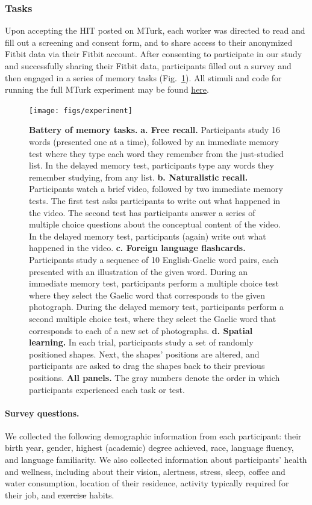 \documentclass[10pt]{article}
\providecommand{\DIFaddtex}[1]{{\protect\color{blue}\uwave{#1}}} %
\providecommand{\DIFdeltex}[1]{{\protect\color{red}\sout{#1}}}                      %
\providecommand{\DIFaddbegin}{} %
\providecommand{\DIFaddend}{} %
\providecommand{\DIFdelbegin}{} %
\providecommand{\DIFdelend}{} %
\providecommand{\DIFadd}[1]{\texorpdfstring{\DIFaddtex{#1}}{#1}} %
\providecommand{\DIFdel}[1]{\texorpdfstring{\DIFdeltex{#1}}{}} %
\newcommand{\DIFscaledelfig}{0.5}
\newlength{\DIFdelgraphicswidth} %
\newlength{\DIFdelgraphicsheight} %
\newcommand{\DIFaddincludegraphics}[2][]{{\color{blue}\fbox{\DIFOincludegraphics[#1]{#2}}}} %
\newcommand{\DIFdelincludegraphics}[2][]{%
\sbox{\DIFdelgraphicsbox}{\DIFOincludegraphics[#1]{#2}}%
\settoboxwidth{\DIFdelgraphicswidth}{\DIFdelgraphicsbox} %
\settoboxtotalheight{\DIFdelgraphicsheight}{\DIFdelgraphicsbox} %
\scalebox{\DIFscaledelfig}{%
\parbox[b]{\DIFdelgraphicswidth}{\usebox{\DIFdelgraphicsbox}\\[-\baselineskip] \rule{\DIFdelgraphicswidth}{0em}}\llap{\resizebox{\DIFdelgraphicswidth}{\DIFdelgraphicsheight}{%
\setlength{\unitlength}{\DIFdelgraphicswidth}%
\begin{picture}(1,1)%
\thicklines\linethickness{2pt} %
{\color[rgb]{1,0,0}\put(0,0){\framebox(1,1){}}}%
{\color[rgb]{1,0,0}\put(0,0){\line( 1,1){1}}}%
{\color[rgb]{1,0,0}\put(0,1){\line(1,-1){1}}}%
\end{picture}%
}\hspace*{3pt}}} %
} %
\DeclareRobustCommand{\DIFaddbegin}{\DIFOaddbegin \let\includegraphics\DIFaddincludegraphics} %
\DeclareRobustCommand{\DIFaddend}{\DIFOaddend \let\includegraphics\DIFOincludegraphics} %
\DeclareRobustCommand{\DIFdelbegin}{\DIFOdelbegin \let\includegraphics\DIFdelincludegraphics} %
\DeclareRobustCommand{\DIFdelend}{\DIFOaddend \let\includegraphics\DIFOincludegraphics} %
\begin{document}
\subsubsection*{Tasks}
Upon accepting the HIT posted on MTurk, each worker was
directed to read and fill out a screening and consent form, and to
share access to their anonymized Fitbit data via their Fitbit account.
After consenting to participate in our study and successfully sharing their Fitbit
data, participants filled out a survey and then engaged in a series of
memory tasks (Fig.~\ref{fig:tasks}).  All stimuli and code for running
the full MTurk experiment may be found
\href{https://github.com/ContextLab/brainfit-task}{\underline{here}}.

\begin{figure}[tp]
\centering
\texttt{[image: figs/experiment]}
\caption{\textbf{Battery of memory tasks.}  \textbf{a.  Free recall.}
Participants study 16 words (presented one at a time), followed by an
immediate memory test where they type
each word they remember from the just-studied list.  In the delayed
memory test, participants type any words they remember studying, from
any list.  \textbf{b. Naturalistic recall.}  Participants watch a
brief video, followed by two immediate memory tests.  The first test
asks participants to write out what happened in the video.  The second
test has participants answer a series of multiple choice questions
about the conceptual content of the video.  In the delayed memory
test, participants (again) write out what happened in the video.
\textbf{c. Foreign language flashcards.}  Participants study a
sequence of 10 English-Gaelic word pairs, each presented with an
illustration of the given word.  During an immediate memory test,
participants perform a multiple choice test where they select the
Gaelic word that corresponds to the given photograph.  During the
delayed memory test, participants perform a second multiple choice
test, where they select the Gaelic word that corresponds to each of a
new set of photographs.  \textbf{d. Spatial learning.}  In each trial,
participants
study a set of randomly positioned shapes.  Next, the shapes'
positions are altered, and participants are asked to drag the shapes
back to their previous positions.  \textbf{All panels.}  The gray
numbers denote the order in which participants experienced each task
or test.}
\label{fig:tasks}
\end{figure}

\paragraph*{Survey questions.}  We collected the following demographic
information from each participant: their birth year, gender, highest
(academic) degree achieved, race, language fluency, and language
familiarity.  We also collected information about participants'
health and wellness, including about their vision, alertness, stress, sleep, coffee
and water consumption, location of their residence, activity typically
required for their job, and \DIFdelbegin \DIFdel{exercise }\DIFdelend \DIFaddbegin \DIFadd{physical activity }\DIFaddend habits.
\end{document}
